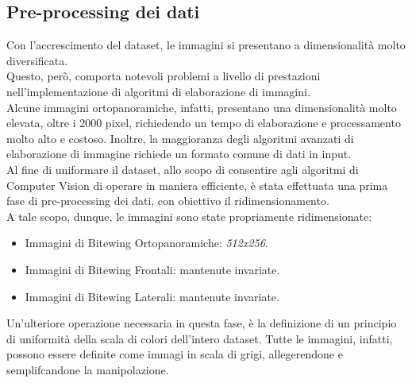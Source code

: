 \documentclass[12pt,a4paper,openright,twoside]{book}
\begin{document}
\newpage
\subsection{Pre-processing dei dati}
Con l'accrescimento del dataset, le immagini si presentano a dimensionalità molto diversificata.\\
Questo, però, comporta notevoli problemi a livello di prestazioni nell'implementazione di algoritmi di elaborazione di immagini.\\
Alcune immagini ortopanoramiche, infatti, presentano una dimensionalità molto elevata, oltre i 2000 pixel, richiedendo un tempo di elaborazione e processamento molto alto e costoso. Inoltre, la maggioranza degli algoritmi avanzati di elaborazione di immagine richiede un formato comune di dati in input.\\
Al fine di uniformare il dataset, allo scopo di consentire agli algoritmi di Computer Vision di operare in maniera efficiente, è stata effettuata una prima fase di pre-processing dei dati, con obiettivo il ridimensionamento.\\
A tale scopo, dunque, le immagini sono state propriamente ridimensionate:
\begin{itemize}
\item Immagini di Bitewing Ortopanoramiche: {\itshape 512x256}.
\item Immagini di Bitewing Frontali: mantenute invariate.
\item Immagini di Bitewing Laterali: mantenute invariate.
\end{itemize}

Un'ulteriore operazione necessaria in questa fase, è la definizione di un principio di uniformità della scala di colori dell'intero dataset. Tutte le immagini, infatti, possono essere definite come immagi in scala di grigi, allegerendone e semplifcandone la manipolazione.

\end{document}
